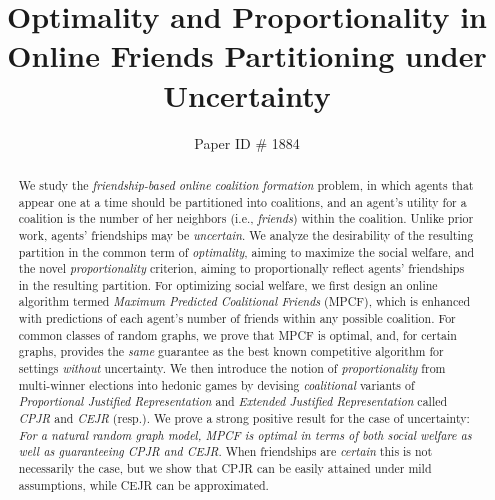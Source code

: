 \documentclass[letterpaper]{article}
\title{Optimality and Proportionality in Online Friends Partitioning under Uncertainty}
\author{Paper ID \# 1884}
\begin{document}
\maketitle

\begin{abstract}
We study the \textit{friendship-based online coalition formation} problem, in which agents that appear one at a time should be partitioned into coalitions, and an agent's utility for a coalition is the number of her neighbors (i.e., \textit{friends}) within the coalition. Unlike prior work, agents' friendships may be \textit{uncertain}. We analyze the desirability of the resulting partition in the common term of \textit{optimality}, aiming to maximize the social welfare, and the novel \textit{proportionality} criterion, aiming to proportionally reflect agents' friendships in the resulting partition. For optimizing social welfare, we first design an online algorithm termed \textit{Maximum Predicted Coalitional Friends} (MPCF), which is enhanced with predictions of each agent's number of friends within any possible coalition. For common classes of random graphs, we prove that MPCF is optimal, and, for certain graphs, provides the \textit{same} guarantee as the best known competitive algorithm for settings \textit{without} uncertainty. %
We then introduce the notion of \textit{proportionality} from multi-winner elections into hedonic games by devising \textit{coalitional} variants of \textit{Proportional Justified Representation} and \textit{Extended Justified Representation} called \textit{CPJR} and \textit{CEJR} (resp.). We prove a strong positive result for the case of uncertainty: \textit{For a natural random graph model, MPCF is optimal in terms of both social welfare as well as guaranteeing CPJR and CEJR}. When friendships are \textit{certain} this is not necessarily the case, but we show that CPJR can be easily attained under mild assumptions, while CEJR can be approximated.
\end{abstract}
\end{document}
